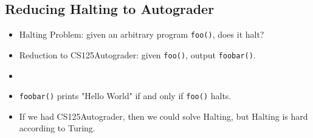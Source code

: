 \subsection{Reducing Halting to Autograder}
\begin{itemize}
    \item Halting Problem: given an arbitrary program \texttt{foo()}, does it halt?
    \item Reduction to CS125Autograder: given \texttt{foo()}, output \texttt{foobar()}.
    \item[] 
    \item \texttt{foobar()} prints "Hello World" if and only if \texttt{foo()} halts.
    \item If we had CS125Autograder, then we could solve Halting, but Halting is hard according to Turing.
\end{itemize}

